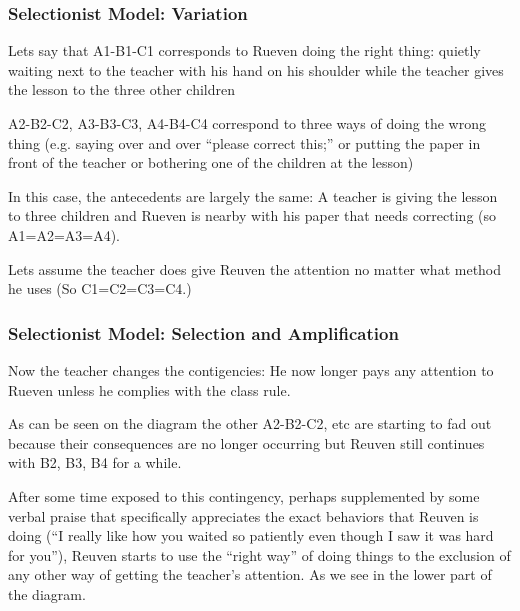 \documentclass[12pt, handout, notes=show]{beamer}
\begin{document}
\begin{frame}
  \frametitle{Selectionist Model: Variation}
  \begin{itemize}
    \small{
    \item Lets say that A1-B1-C1 corresponds to Rueven doing the right
      thing: quietly waiting next to the teacher with his hand on his
      shoulder while the teacher gives the lesson to the three other
      children
    \item A2-B2-C2, A3-B3-C3, A4-B4-C4 correspond to three ways of
      doing the wrong thing (e.g. saying over and over ``please
      correct this;'' or putting the paper in front of the teacher or
      bothering one of the children at the lesson)
    \item In this case, the antecedents are largely the same: A
      teacher is giving the lesson to three children and Rueven is
      nearby with his paper that needs correcting (so A1=A2=A3=A4).
    \item Lets assume the teacher does give Reuven the attention no
      matter what method he uses (So C1=C2=C3=C4.)  }
  \end{itemize}

\end{frame}

\begin{frame}
  \frametitle{Selectionist Model: Selection and Amplification}
  \begin{itemize}
    \small{
    \item Now the teacher changes the contigencies: He now longer pays
      any attention to Rueven unless he complies with the class rule.
    \item As can be seen on the diagram the other A2-B2-C2, etc are
      starting to fad out because their consequences are no longer
      occurring but Reuven still continues with B2, B3, B4 for a
      while.
    \item After some time exposed to this contingency, perhaps
      supplemented by some verbal praise that specifically appreciates
      the exact behaviors that Reuven is doing (``I really like how
      you waited so patiently even though I saw it was hard for
      you''), Reuven starts to use the ``right way'' of doing things
      to the exclusion of any other way of getting the teacher's
      attention. As we see in the lower part of the diagram. }
  \end{itemize}

\end{frame}
  
\end{document}
